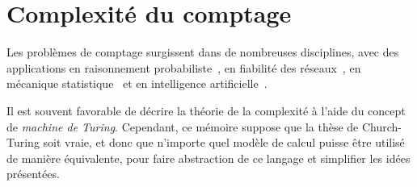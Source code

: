\chapter{Complexité du comptage}
\label{cha:complexite-du-comptage}

Les problèmes de comptage surgissent dans de nombreuses disciplines, avec des applications en raisonnement probabiliste~\cite{rothHardnessApproximateReasoning1996, sangPerformingBayesianInference2005, abramsonHailfinderBayesianSystem1996}, en fiabilité des réseaux~\cite{valiantComplexityEnumerationReliability1979, duenas-osorioCountingBasedReliabilityEstimation2017}, en mécanique statistique~\cite{jerrumPolynomialtimeApproximationAlgorithms1993} et en intelligence artificielle~\cite{balutaQuantitativeVerificationNeural2019}.

Il est souvent favorable de décrire la théorie de la complexité à l'aide du concept de \textit{machine de Turing}. Cependant, ce mémoire suppose que la thèse de Church-Turing soit vraie, et donc que n'importe quel modèle de calcul puisse être utilisé de manière équivalente, pour faire abstraction de ce langage et simplifier les idées présentées.


